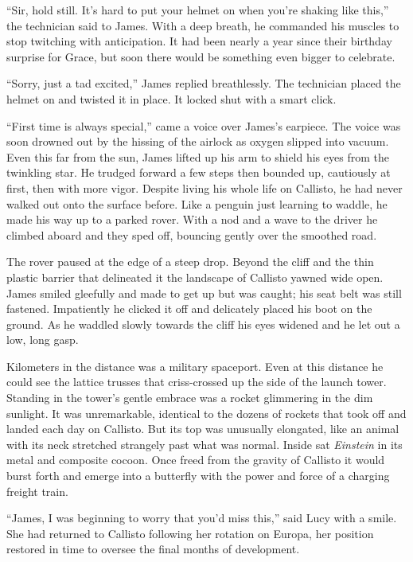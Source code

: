 \documentclass[12pt]{article} %
\begin{document}
``Sir, hold still. It's hard to put your helmet on when you're shaking like this,'' the technician said to James. With a deep breath, he commanded his muscles to stop twitching with anticipation. It had been nearly a year since their birthday surprise for Grace, but soon there would be something even bigger to celebrate.

``Sorry, just a tad excited,'' James replied breathlessly. The technician placed the helmet on and twisted it in place. It locked shut with a smart click.

``First time is always special,'' came a voice over James's earpiece. The voice was soon drowned out by the hissing of the airlock as oxygen slipped into vacuum. Even this far from the sun, James lifted up his arm to shield his eyes from the twinkling star. He trudged forward a few steps then bounded up, cautiously at first, then with more vigor. Despite living his whole life on Callisto, he had never walked out onto the surface before. Like a penguin just learning to waddle, he made his way up to a parked rover. With a nod and a wave to the driver he climbed aboard and they sped off, bouncing gently over the smoothed road.

The rover paused at the edge of a steep drop. Beyond the cliff and the thin plastic barrier that delineated it the landscape of Callisto yawned wide open. James smiled gleefully and made to get up but was caught; his seat belt was still fastened. Impatiently he clicked it off and delicately placed his boot on the ground. As he waddled slowly towards the cliff his eyes widened and he let out a low, long gasp.

Kilometers in the distance was a military spaceport. Even at this distance he could see the lattice trusses that criss-crossed up the side of the launch tower. Standing in the tower's gentle embrace was a rocket glimmering in the dim sunlight. It was unremarkable, identical to the dozens of rockets that took off and landed each day on Callisto. But its top was unusually elongated, like an animal with its neck stretched strangely past what was normal. Inside sat \textit{Einstein} in its metal and composite cocoon. Once freed from the gravity of Callisto it would burst forth and emerge into a butterfly with the power and force of a charging freight train.

``James, I was beginning to worry that you'd miss this,'' said Lucy with a smile. She had returned to Callisto following her rotation on Europa, her position restored in time to oversee the final months of development.
\end{document}
